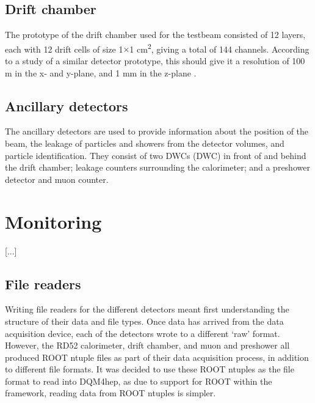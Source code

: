 \subsection{Drift chamber}
The prototype of the drift chamber used for the testbeam consisted of 12 layers, each with 12 drift cells of size 1$\times$1 cm\textsuperscript{2}, giving a total of 144 channels. According to a study of a similar detector prototype, this should give it a resolution of 100 \textmu m in the x- and y-plane, and 1 mm in the z-plane \cite{idea-drift-chamber} .

\subsection{Ancillary detectors}
The ancillary detectors are used to provide information about the position of the beam, the leakage of particles and showers from the detector volumes, and particle identification. They consist of two \acrlong{DWC}s (\acrshort{DWC}) in front of and behind the drift chamber; leakage counters surrounding the calorimeter; and a preshower detector and muon counter.

\section{Monitoring}
[...]


\subsection{File readers}
Writing file readers for the different detectors meant first understanding the structure of their data and file types. Once data has arrived from the data acquisition device, each of the detectors wrote to a different `raw' format. However, the RD52 calorimeter, drift chamber, and muon and preshower all produced ROOT ntuple files as part of their data acquisition process, in addition to different file formats. It was decided to use these ROOT ntuples as the file format to read into \acrshort{DQM4hep}, as due to support for ROOT within the framework, reading data from ROOT ntuples is simpler.

